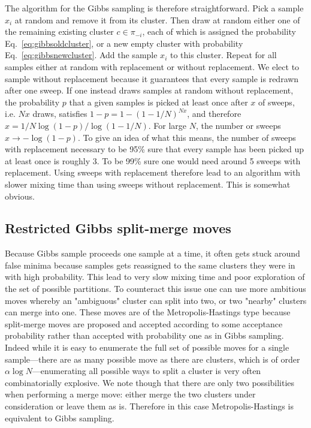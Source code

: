\documentclass[11pt, oneside]{article}   	%
\begin{document}
The algorithm for the Gibbs sampling is therefore straightforward. Pick a sample $x_i$ at random and remove it from its cluster. Then draw at random either one of the remaining existing cluster $c\in\pi_{-i}$, each of which is assigned the probability Eq.~\ref{eq:gibbsoldcluster}, or a new empty cluster with probability Eq.~\ref{eq:gibbsnewcluster}. Add the sample $x_i$ to this cluster. Repeat for all samples either at random with replacement or without replacement. We elect to sample without replacement because it guarantees that every sample is redrawn after one sweep. If one instead draws samples at random without replacement, the probability $p$ that a given samples is picked at least once after $x$ of sweeps, i.e. $Nx$ draws, satisfies $1 - p = 1 - (1 - 1/N)^{Nx}$, and therefore $x = 1/N \log(1 - p)/\log(1 - 1/N)$. For large $N$, the number or sweeps $x\rightarrow -\log(1 -p)$. To give an idea of what this means, the number of sweeps with replacement necessary to be 95\% sure that every sample has been picked up at least once is roughly 3. To be 99\% sure one would need around 5 sweeps with replacement. Using sweeps with replacement therefore lead to an algorithm with slower mixing time than using sweeps without replacement. This is somewhat obvious.
\subsection{Restricted Gibbs split-merge moves}
Because Gibbs sample proceeds one sample at a time, it often gets stuck around false minima because samples gets reassigned to the same clusters they were in with high probability. This lead to very slow mixing time and poor exploration of the set of possible partitions. To counteract this issue one can use more ambitious moves whereby an "ambiguous" cluster can split into two, or two "nearby" clusters can merge into one. These moves are of the Metropolis-Hastings type because split-merge moves are proposed and accepted according to some acceptance probability rather than accepted with probability one as in Gibbs sampling. Indeed while it is easy to enumerate the full set of possible moves for a single sample---there are as many possible move as there are clusters, which is of order $\alpha \log N$---enumerating all possible ways to split a cluster is very often combinatorially explosive. We note though that there are only two possibilities when performing a merge move: either merge the two clusters under consideration or leave them as is. Therefore in this case Metropolis-Hastings is equivalent to Gibbs sampling.
\end{document}
